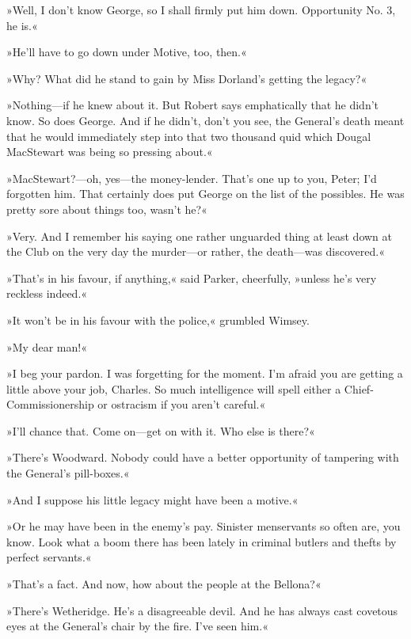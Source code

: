 »Well, I don't know George, so I shall firmly put him down. Opportunity No. 3, he is.«

»He'll have to go down under Motive, too, then.«

»Why? What did he stand to gain by Miss Dorland's getting the legacy?«

»Nothing\allowbreak---\allowbreak if he knew about it. But Robert says emphatically that he didn't know. So does George. And if he didn't, don't you see, the General's death meant that he would immediately step into that two thousand quid which Dougal MacStewart was being so pressing about.«

»MacStewart?---oh, yes\allowbreak---\allowbreak the money-lender. That's one up to you, Peter; I'd forgotten him. That certainly does put George on the list of the possibles. He was pretty sore about things too, wasn't he?«

»Very. And I remember his saying one rather unguarded thing at least down at the Club on the very day the murder\allowbreak---\allowbreak or rather, the death\allowbreak---\allowbreak was discovered.«

»That's in his favour, if anything,« said Parker, cheerfully, »unless he's very reckless indeed.«

»It won't be in his favour with the police,« grumbled Wimsey.

»My dear man!«

»I beg your pardon. I was forgetting for the moment. I'm afraid you are getting a little above your job, Charles. So much intelligence will spell either a Chief-Commissionership or ostracism if you aren't careful.«

»I'll chance that. Come on\allowbreak---\allowbreak get on with it. Who else is there?«

»There's Woodward. Nobody could have a better opportunity of tampering with the General's pill-boxes.«

»And I suppose his little legacy might have been a motive.«

»Or he may have been in the enemy's pay. Sinister menservants so often are, you know. Look what a boom there has been lately in criminal butlers and thefts by perfect servants.«

»That's a fact. And now, how about the people at the Bellona?«

»There's Wetheridge. He's a disagreeable devil. And he has always cast covetous eyes at the General's chair by the fire. I've seen him.«


